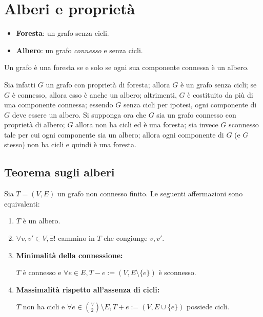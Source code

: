 
\section{Alberi e proprietà}

\begin{tcolorbox}[colback=yellow!30, colframe=yellow!30!black, title = {Alberi e Foreste}]
\begin{itemize}
    \item \textbf{Foresta}: un grafo senza cicli.
    \item \textbf{Albero}: un grafo \textit{connesso} e senza cicli.
\end{itemize}
\end{tcolorbox}

\begin{osservaz}
Un grafo è una foresta se e solo se ogni sua componente connessa è un albero.

Sia infatti $G$ un grafo con proprietà di foresta; allora $G$ è un grafo senza
cicli; se $G$ è connesso, allora esso è anche un albero; altrimenti, $G$ è
costituito da più di una componente connessa; essendo $G$ senza cicli per
ipotesi, ogni componente di $G$ deve essere un albero. Si supponga ora che
$G$ sia un grafo connesso con proprietà di albero; $G$ allora non ha cicli
ed è una foresta; sia invece $G$ sconnesso tale per cui ogni componente
sia un albero; allora ogni componente di $G$ (e $G$ stesso) non ha cicli
e quindi è una foresta.
\end{osservaz}

\subsection*{Teorema sugli alberi}
Sia $T=(V,E)$ un grafo non connesso finito. Le seguenti affermazioni
sono equivalenti:
\begin{enumerate}
\item $T$ è un albero.
\item $\forall v,v'\in V, \exists!$ cammino in $T$ che congiunge $v,v'$.
\item \textbf{Minimalità della connessione:}

$T$ è connesso e $\forall e\in E, T-e:=(V,E\setminus \{e\})$ è sconnesso.


\item \textbf{Massimalità rispetto all'assenza di cicli:}

$T$ non ha cicli e $\forall e \in \binom{V}{2}\setminus E, T+e:=(V,E\cup\{e\})$ possiede cicli.
\end{enumerate}

